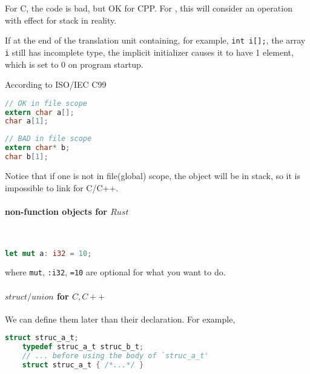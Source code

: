 For {C}, the code is bad, but OK for {CPP}. For , this will consider an operation with effect for stack in reality.

If at the end of the translation unit containing, for example, \verb`int i[];`, the array \verb`i` still has incomplete type, the implicit initializer causes it to have 1 element, which is set to 0 on program startup.

According to ISO/IEC C99
\lstset{style=GlobalC}
\begin{lstlisting}[language=C]
// OK in file scope
extern char a[];
char a[1];
\end{lstlisting}
\begin{lstlisting}[language=C]
// BAD in file scope
extern char* b;
char b[1];
\end{lstlisting}
Notice that if one is not in file(global) scope, the object will be in stack, so it is impossible to link for C/C++.


\paragraph{non-function objects for $Rust$} \

\lstset{style=GlobalRust}
\begin{lstlisting}[language=Rust]
let mut a: i32 = 10;
\end{lstlisting}
where \verb`mut`, \verb`:i32`, \verb`=10` 
are optional for what you want to do.


\paragraph{$struct/union$ for $C,C++$}

We can define them later than their declaration. For example,
\lstset{style=GlobalC}
\begin{lstlisting}[language=C]
	struct struc_a_t;
	typedef struc_a_t struc_b_t;
	// ... before using the body of `struc_a_t'
	struct struc_a_t { /*...*/ }
\end{lstlisting}


